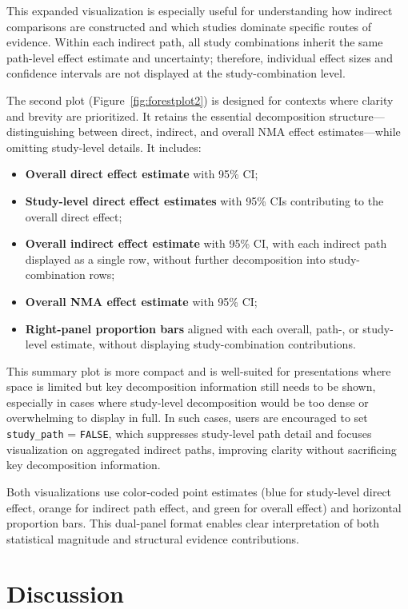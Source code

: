 This expanded visualization is especially useful for understanding how indirect comparisons are constructed and which studies dominate specific routes of evidence. Within each indirect path, all study combinations inherit the same path-level effect estimate and uncertainty; therefore, individual effect sizes and confidence intervals are not displayed at the study-combination level.

The second plot (Figure~\ref{fig:forestplot2}) is designed for contexts where clarity and brevity are prioritized. It retains the essential decomposition structure—distinguishing between direct, indirect, and overall NMA effect estimates—while omitting study-level details.
It includes:
\begin{itemize}
  \item \textbf{Overall direct effect estimate} with 95\% CI;
  \item \textbf{Study-level direct effect estimates} with 95\% CIs contributing to the overall direct effect;
  \item \textbf{Overall indirect effect estimate} with 95\% CI, with each indirect path displayed as a single row, without further decomposition into study-combination rows;
  \item \textbf{Overall NMA effect estimate} with 95\% CI;
  \item \textbf{Right-panel proportion bars} aligned with each overall, path-, or study-level estimate, without displaying study-combination contributions.
\end{itemize}

This summary plot is more compact and is well-suited for presentations where space is limited but key decomposition information still needs to be shown, especially in cases where study-level decomposition would be too dense or overwhelming to display in full. In such cases, users are encouraged to set \texttt{study\_path} = \texttt{FALSE}, which suppresses study-level path detail and focuses visualization on aggregated indirect paths, improving clarity without sacrificing key decomposition information.

Both visualizations use color-coded point estimates (blue for study-level direct effect, orange for indirect path effect, and green for overall effect) and horizontal proportion bars. This dual-panel format enables clear interpretation of both statistical magnitude and structural evidence contributions.

\section{Discussion}

